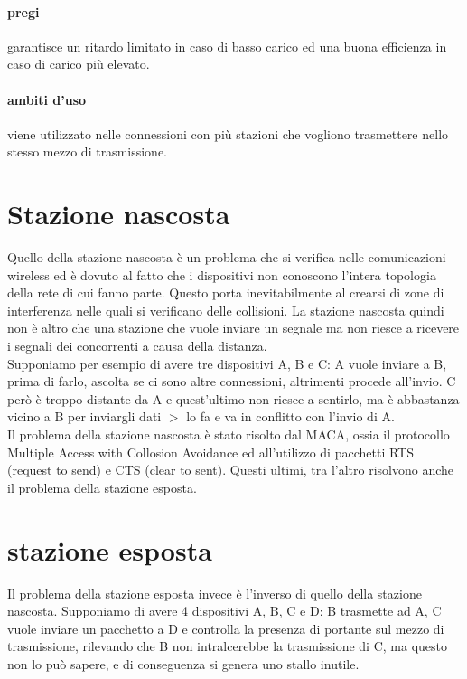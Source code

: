 \documentclass{article}
\begin{document}
\paragraph{pregi} garantisce un ritardo limitato in caso di basso carico ed una
buona efficienza in caso di carico più elevato.

\paragraph{ambiti d'uso} viene utilizzato nelle connessioni con più stazioni che
vogliono trasmettere nello stesso mezzo di trasmissione.

\section{Stazione nascosta}

Quello della stazione nascosta è un problema che si verifica nelle comunicazioni
wireless ed è dovuto al fatto che i dispositivi non conoscono l'intera topologia
della rete di cui fanno parte. Questo porta inevitabilmente al crearsi di zone
di interferenza nelle quali si verificano delle collisioni. La stazione nascosta
quindi non è altro che una stazione che vuole inviare un segnale ma non riesce a
ricevere i segnali dei concorrenti a causa della distanza.\\
Supponiamo per esempio di avere tre dispositivi A, B e C: A vuole inviare a B,
prima di farlo, ascolta se ci sono altre connessioni, altrimenti procede
all'invio. C però è troppo distante da A e quest'ultimo non riesce a sentirlo,
ma è abbastanza vicino a B per inviargli dati $>$ lo fa e va in conflitto con
l'invio di A.\\
Il problema della stazione nascosta è stato risolto dal MACA, ossia il
protocollo Multiple Access with Collosion Avoidance ed all'utilizzo di pacchetti
RTS (request to send) e CTS (clear to sent). Questi ultimi, tra l'altro
risolvono anche il problema della stazione esposta.

\section{stazione esposta}

Il problema della stazione esposta invece è l'inverso di quello della stazione
nascosta. Supponiamo di avere 4 dispositivi A, B, C e D: B trasmette ad A, C
vuole inviare un pacchetto a D e controlla la presenza di portante sul mezzo di
trasmissione, rilevando che B non intralcerebbe la trasmissione di C, ma questo
non lo può sapere, e di conseguenza si genera uno stallo inutile.\\
\end{document}
